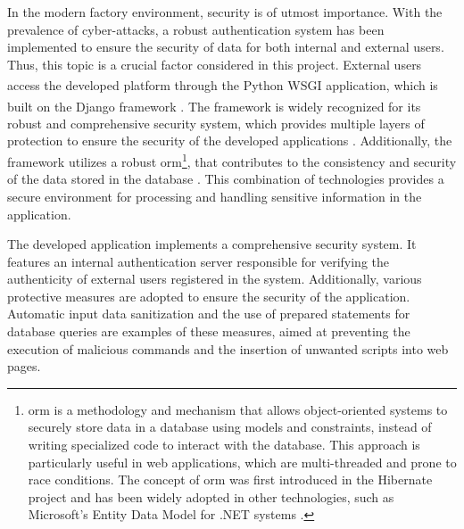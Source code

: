 In the modern factory environment, security is of utmost importance. With the prevalence of cyber-attacks, a robust authentication system has been implemented to ensure the security of data for both internal and external users. Thus, this topic is a crucial factor considered in this project. External users access the developed platform through the Python\textsuperscript{\textregistered} WSGI application, which is built on the Django\textsuperscript{\textregistered} framework \cite{django}. The framework is widely recognized for its robust and comprehensive security system, which provides multiple layers of protection to ensure the security of the developed applications \cite{duisebekova2021django}. Additionally, the framework utilizes a robust \acrfull{orm}\footnote{\acrfull{orm} is a methodology and mechanism that allows object-oriented systems to securely store data in a database using models and constraints, instead of writing specialized code to interact with the database. This approach is particularly useful in web applications, which are multi-threaded and prone to race conditions. The concept of \acrshort{orm} was first introduced in the Hibernate project and has been widely adopted in other technologies, such as Microsoft's Entity Data Model for .NET systems  \cite{Elizabeth2008}.},  that contributes to the consistency and security of the data stored in the database \cite{duisebekova2021django,django-docs}. This combination of technologies provides a secure environment for processing and handling sensitive information in the application.

The developed application implements a comprehensive security system. It features an internal authentication server responsible for verifying the authenticity of external users registered in the system. Additionally, various protective measures are adopted to ensure the security of the application. Automatic input data sanitization and the use of prepared statements for database queries are examples of these measures, aimed at preventing the execution of malicious commands and the insertion of unwanted scripts into web pages.


